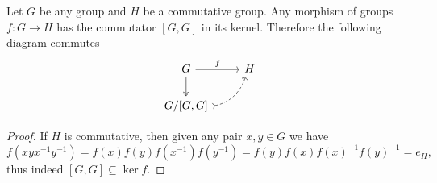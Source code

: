 \begin{lemma}
    \label{lem:commutator-kernel}
    Let \(G\) be any group and \(H\) be a commutative group. Any morphism of groups
    \(f: G \to H\) has the commutator \([G, G]\) in its kernel. Therefore the
    following diagram commutes
    \[
        \begin{tikzcd}
            G \ar[r, "f"] \ar[d, two heads]            & H \\
            G/[G, G] \ar[ru, bend right, dashed, tail] &
        \end{tikzcd}
    \]
\end{lemma}

\begin{proof}
    If \(H\) is commutative, then given any pair \(x, y \in G\) we have
    \[
        f(x y x^{-1} y^{-1})
        = f(x) f(y) f(x^{-1}) f(y^{-1})
        = f(y) f(x) f(x)^{-1} f(y)^{-1}
        = e_H,
    \]
    thus indeed \([G, G] \subseteq \ker f\).
\end{proof}

